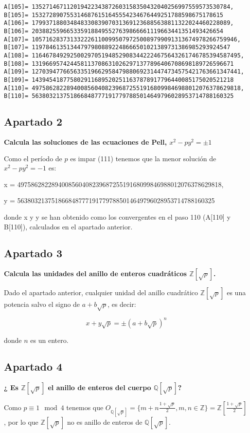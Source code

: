 \documentclass[a4paper]{article}
\begin{document}
\begin{verbatim}
A[105]= 135271467112019422343872603158350432040256997559573530784, 
B[105]= 1532728907553146876151645554234676449251788598675178615
A[106]= 179937188034848330839070313691236885638811322024460228089, 
B[106]= 2038825596653359188495527639866661119663441351493426654
A[107]= 10571628373133222611009950797250089799091313674978266759946, 
B[107]= 119784613513447979808892248666501021389731386985293924547
A[108]= 116467849292500297051948529083442224675643261746785394587495, 
B[108]= 1319669574244581137086310262971377896406708698189726596671
A[109]= 127039477665633519662958479880692314474734575421763661347441, 
B[109]= 1439454187758029116895202511637878917796440085175020521218
A[110]= 497586282289400856040823968725519168099846988012076378629818, 
B[110]= 5638032137518668487771917797885014649796028953714788160325
\end{verbatim}

\subsection{Apartado 2}
\textbf{Calcula las soluciones de las ecuaciones de Pell, $x^2 - py^2=\pm 1$}

Como el período de $p$ es impar (111) tenemos que la menor solución de $x^2-py^2=-1$ es:

x = 497586282289400856040823968725519168099846988012076378629818, 

y = 5638032137518668487771917797885014649796028953714788160325

donde x y y se han obtenido como los convergentes en el paso 110 (A[110] y B[110]), calculados en el apartado anterior.


\subsection{Apartado 3}

\textbf{Calcula las unidades del anillo de enteros cuadráticos $\mathbb{Z}[\sqrt{p}]$.}

Dado el apartado anterior, cualquier unidad del anillo cuadrático $\mathbb{Z}[\sqrt{p}]$ es una potencia salvo el signo de $a+b\sqrt{p}$, es decir:

$$x+y\sqrt{p}=\pm (a+b\sqrt{p})^n$$

donde $n$ es un entero.

\subsection{Apartado 4}

\textbf{¿ Es $\mathbb{Z}[\sqrt{p}]$ el anillo de enteros del cuerpo $\mathbb{Q}[\sqrt{p}]$?}

Como $p\equiv 1 \mod 4$ tenemos que $O_{\mathbb{Q}[\sqrt{p}]}=\{ m+n\frac{1+\sqrt{p}}{2}, m,n\in\mathbb{Z}\} =\mathbb{Z}[\frac{1+\sqrt{p}}{2}]$, por lo que $\mathbb{Z}[\sqrt{p}]$ no es anillo de enteros de $\mathbb{Q}[\sqrt{p}]$.
\end{document}
